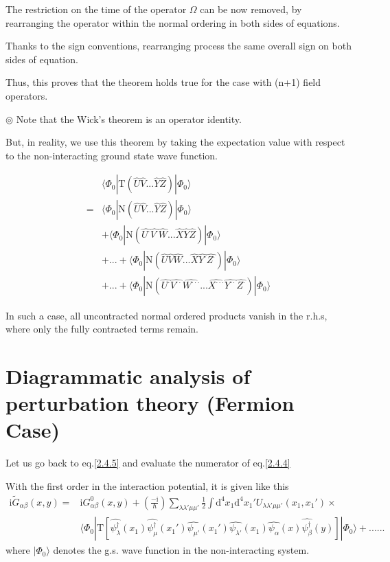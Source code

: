 The restriction on the time of the operator $\Omega$ can be now removed, by rearranging the operator within the normal ordering in both sides of equations.

Thanks to the sign conventions, rearranging process the same overall sign on both sides of equation.

Thus, this proves that the theorem holds true for the case with (n+1) field operators.

$\circledcirc$ Note that the Wick's theorem is an operator identity.

But, in reality, we use this theorem by taking the expectation value with respect to the non-interacting ground state wave function.

\begin{align}
&\langle \Phi_0|\mathrm{T}(\hat{U}\hat{V}...\hat{Y}\hat{Z})|\Phi_0\rangle\nonumber\\
=&\langle \Phi_0|\mathrm{N}(\hat{U}\hat{V}...\hat{Y}\hat{Z})|\Phi_0\rangle\nonumber\\
&+\langle \Phi_0|\mathrm{N}(\hat{U^{\cdot}}\hat{V^{\cdot}}\hat{W}...\hat{X}\hat{Y}\hat{Z})|\Phi_0\rangle\nonumber\\
&+...+\langle \Phi_0|\mathrm{N}(\hat{U}\hat{V}\hat{W}...\hat{X}\hat{Y^{\cdot}}\hat{Z^{\cdot}})|\Phi_0\rangle\nonumber\\
&+...+\langle \Phi_0|\mathrm{N}(\hat{U^{\cdot}}\hat{V^{\cdot\cdot}}\hat{W^{\cdot\cdot\cdot}}...\hat{X^{\cdot\cdot\cdot}}\hat{Y^{\cdot\cdot}}\hat{Z^{\cdot}})|\Phi_0\rangle\nonumber
\end{align}

In such a case, all uncontracted normal ordered products vanish in the r.h.s, where only the fully contracted terms remain.

\section{Diagrammatic analysis of perturbation theory (Fermion Case)}\label{S2-5}

Let us go back to eq.\eqref{2.4.5} and evaluate the numerator of eq.\eqref{2.4.4}

With the first order in the interaction  potential, it is given like this 
\begin{align}\label{2.5.1}
\mathrm{i}\tilde G_{\alpha\beta}(x,y)=&\mathrm{i}G^0_{\alpha\beta}(x,y)+(\frac{-\mathrm{i}}{\hbar})\sum_{\lambda\lambda'\mu\mu'}\frac{1}{2} \int \mathrm{d}^4x_1\mathrm{d}^4x_1' U_{\lambda\lambda'\mu\mu'}(x_1,x_1') \times \nonumber \\
&\langle \Phi_0|\mathrm{T}[\hat{\psi_{\lambda}^{\dagger}}(x_1)\hat{\psi_{\mu}^{\dagger}}(x_1')\hat{\psi_{\mu'}}(x_1')\hat{\psi_{\lambda'}}(x_1)\hat{\psi_{\alpha}}(x)\hat{\psi_{\beta}^{\dagger}}(y)]|\Phi_0\rangle+...... 
\end{align}
where $|\Phi_0\rangle$ denotes the g.s. wave function in the non-interacting system.

